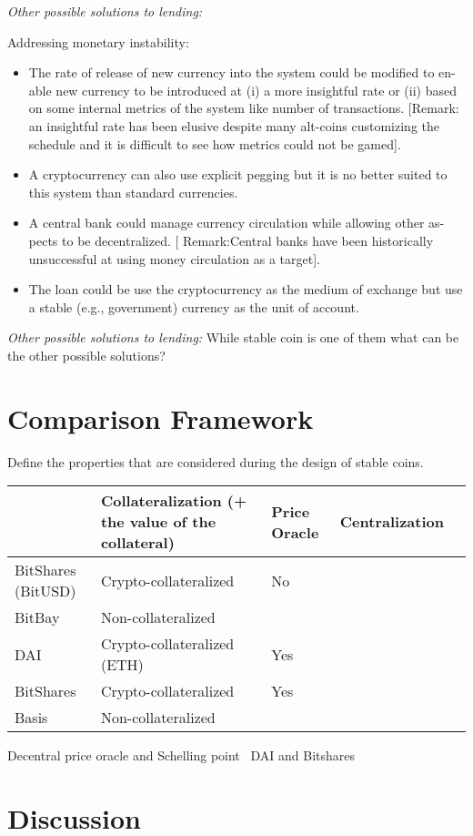 \textit{Other possible solutions to lending:} ~

Addressing monetary instability:
\begin{itemize}
	\item The rate of release of new currency into the system could be modified to en-
	able new currency to be introduced at (i) a more insightful rate or (ii) based
	on some internal metrics of the system like number of transactions. [Remark:
	an insightful rate has been elusive despite many alt-coins customizing the
	schedule and it is difficult to see how metrics could not be gamed].
	\item A cryptocurrency can also use explicit pegging but it is no better suited to this system than standard currencies.
	\item A central bank could manage currency circulation while allowing other as-
	pects to be decentralized. [	Remark:Central banks have been historically
	unsuccessful at using money circulation as a target].
	\item The loan could be use the cryptocurrency as the medium of exchange but
	use a stable (e.g.,	government) currency as the unit of account.
\end{itemize}

\textit{Other possible solutions to lending:} While stable coin is one of them what can be the other possible solutions?

\section{Comparison Framework} %
Define the properties that are considered during the design of stable coins.
~
\begin{table}[]
	\begin{tabular}{|l|l|l|l|l|}
		\hline
		& Collateralization (+ the value of the collateral) & Price Oracle & Centralization  \\ \hline
		BitShares (BitUSD) &  Crypto-collateralized &  No & \\ \hline
		BitBay & Non-collateralized & &  \\ \hline
		 DAI& Crypto-collateralized (ETH)  &  Yes& \\ \hline
		 BitShares&Crypto-collateralized&Yes&\\ \hline
		 Basis&Non-collateralized&& \\ \hline
	\end{tabular}
\end{table}

Decentral price oracle and Schelling point~\cite{cryptoinsider}
DAI and Bitshares~\cite{cryptoinsider}

\section{Discussion}


